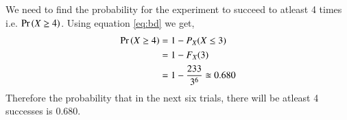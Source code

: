 \documentclass[journal,12pt,twocolumn]{IEEEtran}
\begin{document}
We need to find the probability for the experiment to succeed to atleast 4 times i.e. $\Pr\left(X \ge 4\right)$.
Using equation \ref{eq:bd} we get,
\begin{multline}
\begin{split}
\Pr\left(X \ge 4\right)&= 1-P_X(X \le 3)\\
&=1-F_X(3)\\
&= 1-\frac{233}{3^{6}} \approxeq 0.680
\end{split}
\end{multline}
Therefore the probability that in the next six trials, there will be atleast 4 successes is 0.680.
\end{document}
